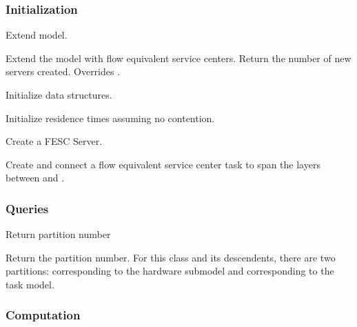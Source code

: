 \subsubsection{Initialization}
\begin{description}

\label{sec:hwsw-layerize-extend}
\item[extend] \texonly{---} Extend model.\\

Extend the model with flow equivalent service centers.  Return the
number of new servers created.  Overrides
.

\item[initialize] \texonly{---} Initialize data structures.\\

Initialize residence times assuming no contention.

\label{sec:hwsw-strict-fesc}
\item[makeFESCServer] \texonly{---} Create a FESC Server.\\

Create and connect a flow equivalent service center task to span the
layers between  and . 

\end{description}

\subsubsection{Queries}

\begin{description}

\label{sec:hwsw-partition}
\item[partition] \texonly{---} Return partition number\\

Return the partition number.  For this class and its
descendents, there are two partitions:  corresponding to
the hardware submodel and  corresponding to the task
model. 

\end{description}


\subsubsection{Computation}

